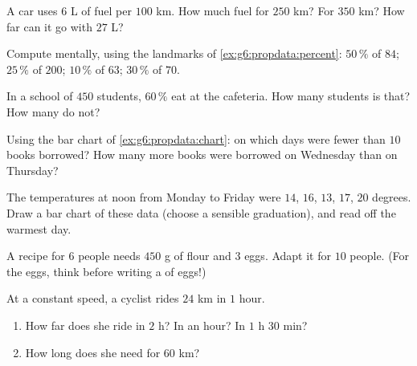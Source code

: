 \begin{exercise}[$\star$]\label{exo:g6:propdata:4}
A car uses $6$ L of fuel per $100$ km. How much fuel for $250$ km? For
$350$ km? How far can it go with $27$ L?
\end{exercise}

\begin{exercise}[$\star$]\label{exo:g6:propdata:5}
Compute mentally, using the landmarks of \cref{ex:g6:propdata:percent}:
$50\,\%$ of $84$; \quad $25\,\%$ of $200$; \quad $10\,\%$ of $63$;
\quad $30\,\%$ of $70$.
\end{exercise}

\begin{exercise}[$\star$]\label{exo:g6:propdata:6}
In a school of $450$ students, $60\,\%$ eat at the cafeteria. How many
students is that? How many do not?
\end{exercise}

\begin{exercise}[$\star$]\label{exo:g6:propdata:7}
Using the bar chart of \cref{ex:g6:propdata:chart}: on which days were
fewer than $10$ books borrowed? How many more books were borrowed on
Wednesday than on Thursday?
\end{exercise}

\begin{exercise}[$\star$]\label{exo:g6:propdata:8}
The temperatures at noon from Monday to Friday were $14$, $16$, $13$,
$17$, $20$ degrees. Draw a bar chart of these data (choose a sensible
graduation), and read off the warmest day.
\end{exercise}

\begin{exercise}[$\star\star$]\label{exo:g6:propdata:9}
A recipe for $6$ people needs $450$ g of flour and $3$ eggs. Adapt it
for $10$ people. (For the eggs, think before writing a 
of eggs!)
\end{exercise}

\begin{exercise}[$\star\star$]\label{exo:g6:propdata:10}
At a constant speed, a cyclist rides $24$ km in $1$ hour.
\begin{enumerate}
  \item How far does she ride in $2$ h? In  an hour? In
        $1$ h $30$ min?
  \item How long does she need for $60$ km?
\end{enumerate}
\end{exercise}

